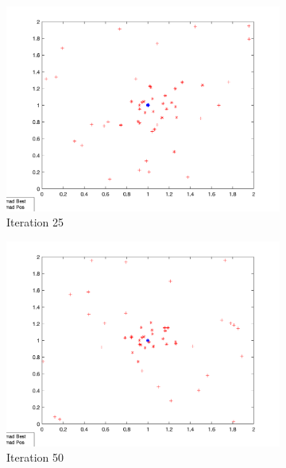 \begin{figure}
  \begin{subfigure}[b]{0.4\textwidth}
    \includegraphics[width=\textwidth]{img/roam/roam-iter-25}
    \caption{Iteration 25}
    \label{fig:roam-iter-0}
  \end{subfigure}
  \begin{subfigure}[b]{0.4\textwidth}
    \includegraphics[width=\textwidth]{img/roam/roam-iter-50}
    \caption{Iteration 50}
    \label{fig:roam-iter-1}
  \end{subfigure}
  \begin{subfigure}[b]{0.4\textwidth}

\end{subfigure}
\end{figure}
